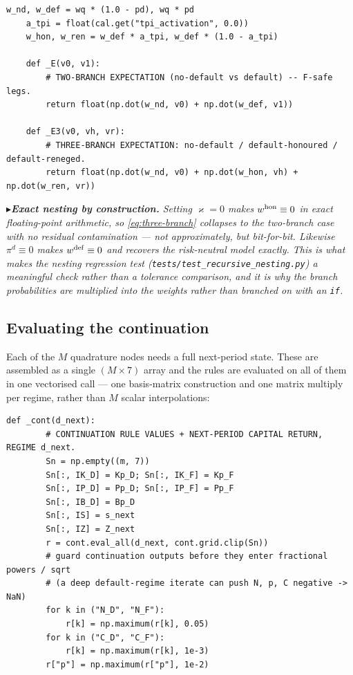 \documentclass[11pt]{article}
\numberwithin{equation}{section}
\newcommand{\code}[1]{\texttt{\small #1}}
\theoremstyle{definition}
\theoremstyle{plain}
\theoremstyle{remark}
\newcommand{\trick}[1]{\par\smallskip\noindent
  \textcolor{notec}{$\blacktriangleright$}\;\emph{#1}\par\smallskip}
\begin{document}
\begin{lstlisting}[caption={Branch weights and the expectation operators. \code{point\_map.py}.}]
    w_nd, w_def = wq * (1.0 - pd), wq * pd
    a_tpi = float(cal.get("tpi_activation", 0.0))
    w_hon, w_ren = w_def * a_tpi, w_def * (1.0 - a_tpi)

    def _E(v0, v1):
        # TWO-BRANCH EXPECTATION (no-default vs default) -- F-safe legs.
        return float(np.dot(w_nd, v0) + np.dot(w_def, v1))

    def _E3(v0, vh, vr):
        # THREE-BRANCH EXPECTATION: no-default / default-honoured / default-reneged.
        return float(np.dot(w_nd, v0) + np.dot(w_hon, vh) + np.dot(w_ren, vr))
\end{lstlisting}

\trick{\textbf{Exact nesting by construction.} Setting $\varkappa=0$ makes
$w^{\rm hon}\equiv0$ in exact floating-point arithmetic, so
\eqref{eq:three-branch} collapses to the two-branch case with no residual
contamination --- not approximately, but bit-for-bit. Likewise $\pi^{d}\equiv0$ makes
$w^{\rm def}\equiv0$ and recovers the risk-neutral model exactly. This is what makes
the nesting regression test (\code{tests/test\_recursive\_nesting.py}) a meaningful
check rather than a tolerance comparison, and it is why the branch probabilities are
multiplied into the weights rather than branched on with an \code{if}.}

\subsection{Evaluating the continuation}

Each of the $M$ quadrature nodes needs a full next-period state. These are assembled
as a single $(M\times7)$ array and the rules are evaluated on all of them in one
vectorised call --- one basis-matrix construction and one matrix multiply per regime,
rather than $M$ scalar interpolations:

\begin{lstlisting}[caption={Vectorised continuation evaluation. \code{point\_map.py}, \code{\_cont}.}]
    def _cont(d_next):
        # CONTINUATION RULE VALUES + NEXT-PERIOD CAPITAL RETURN, REGIME d_next.
        Sn = np.empty((m, 7))
        Sn[:, IK_D] = Kp_D; Sn[:, IK_F] = Kp_F
        Sn[:, IP_D] = Pp_D; Sn[:, IP_F] = Pp_F
        Sn[:, IB_D] = Bp_D
        Sn[:, IS] = s_next
        Sn[:, IZ] = Z_next
        r = cont.eval_all(d_next, cont.grid.clip(Sn))
        # guard continuation outputs before they enter fractional powers / sqrt
        # (a deep default-regime iterate can push N, p, C negative -> NaN)
        for k in ("N_D", "N_F"):
            r[k] = np.maximum(r[k], 0.05)
        for k in ("C_D", "C_F"):
            r[k] = np.maximum(r[k], 1e-3)
        r["p"] = np.maximum(r["p"], 1e-2)
\end{lstlisting}
\end{document}
